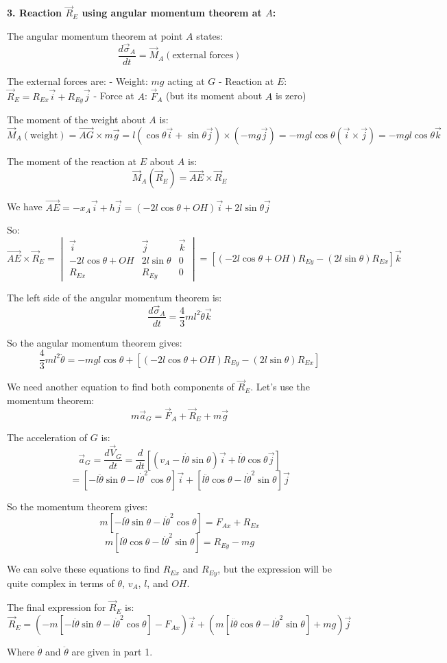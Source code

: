 \documentclass[12pt]{article}
\begin{document}
\begin{correctionbox}
\textbf{3. Reaction $\vec{R}_E$ using angular momentum theorem at $A$:}

The angular momentum theorem at point $A$ states:
$$\frac{d\vec{\sigma}_A}{dt} = \vec{M}_A(\text{external forces})$$

The external forces are:
- Weight: $mg$ acting at $G$
- Reaction at $E$: $\vec{R}_E = R_{Ex}\vec{i} + R_{Ey}\vec{j}$
- Force at $A$: $\vec{F}_A$ (but its moment about $A$ is zero)

The moment of the weight about $A$ is:
$$\vec{M}_A(\text{weight}) = \vec{AG} \times m\vec{g} = l(\cos\theta\vec{i} + \sin\theta\vec{j}) \times (-mg\vec{j}) = -mgl\cos\theta(\vec{i} \times \vec{j}) = -mgl\cos\theta\vec{k}$$

The moment of the reaction at $E$ about $A$ is:
$$\vec{M}_A(\vec{R}_E) = \vec{AE} \times \vec{R}_E$$

We have $\vec{AE} = -x_A\vec{i} + h\vec{j} = (-2l\cos\theta + OH)\vec{i} + 2l\sin\theta\vec{j}$

So:
$$\vec{AE} \times \vec{R}_E = 
\begin{vmatrix}
\vec{i} & \vec{j} & \vec{k} \\
-2l\cos\theta + OH & 2l\sin\theta & 0 \\
R_{Ex} & R_{Ey} & 0
\end{vmatrix}
= [(-2l\cos\theta + OH)R_{Ey} - (2l\sin\theta)R_{Ex}]\vec{k}$$

The left side of the angular momentum theorem is:
$$\frac{d\vec{\sigma}_A}{dt} = \frac{4}{3}ml^2\ddot{\theta}\vec{k}$$

So the angular momentum theorem gives:
$$\frac{4}{3}ml^2\ddot{\theta} = -mgl\cos\theta + [(-2l\cos\theta + OH)R_{Ey} - (2l\sin\theta)R_{Ex}]$$

We need another equation to find both components of $\vec{R}_E$. Let's use the momentum theorem:
$$m\vec{a}_G = \vec{F}_A + \vec{R}_E + m\vec{g}$$

The acceleration of $G$ is:
$$\vec{a}_G = \frac{d\vec{V}_G}{dt} = \frac{d}{dt}[(v_A - l\dot{\theta}\sin\theta)\vec{i} + l\dot{\theta}\cos\theta\vec{j}]$$
$$= [-l\ddot{\theta}\sin\theta - l\dot{\theta}^2\cos\theta]\vec{i} + [l\ddot{\theta}\cos\theta - l\dot{\theta}^2\sin\theta]\vec{j}$$

So the momentum theorem gives:
$$m[-l\ddot{\theta}\sin\theta - l\dot{\theta}^2\cos\theta] = F_{Ax} + R_{Ex}$$
$$m[l\ddot{\theta}\cos\theta - l\dot{\theta}^2\sin\theta] = R_{Ey} - mg$$

We can solve these equations to find $R_{Ex}$ and $R_{Ey}$, but the expression will be quite complex in terms of $\theta$, $v_A$, $l$, and $OH$.

The final expression for $\vec{R}_E$ is:
$$\vec{R}_E = \left(-m[-l\ddot{\theta}\sin\theta - l\dot{\theta}^2\cos\theta] - F_{Ax}\right)\vec{i} + \left(m[l\ddot{\theta}\cos\theta - l\dot{\theta}^2\sin\theta] + mg\right)\vec{j}$$

Where $\dot{\theta}$ and $\ddot{\theta}$ are given in part 1.
\end{correctionbox}
\end{document}
